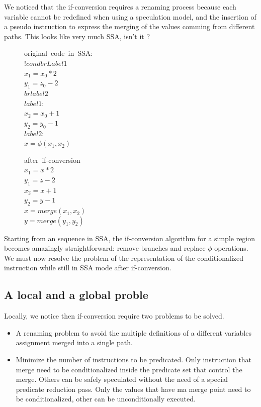 We noticed that the if-conversion requires a renaming process because each variable cannot be redefined when using a speculation model, and the insertion of a pseudo instruction to express the merging of the values comming from different paths. This looks like very much SSA, isn't it ?

\begin{figure}
\begin{minipage}[t]{4cm}
\mbox{original code in SSA:} \\
$ !cond br Label1 $ \\
$ x_1 = x_0 * 2 $ \\
$ y_1 = z_0 - 2 $ \\
$ br label2 $ \\
$ label1: $ \\
$ x_2 = x_0 + 1 $ \\
$ y_2 = y_0 - 1 $ \\
$ label2: $ \\
$ x = \phi (x_1,x_2) $ \\
\end{minipage} 
\begin{minipage}[t]{4cm} 
\mbox{after if-conversion} \\
$ x_1 = x * 2 $ \\
$ y_1 = z - 2 $ \\
$ x_2 = x + 1 $ \\
$ y_2 = y - 1 $ \\
$ x = \textit{merge}(x_1,x_2) $ \\
$ y = \textit{merge}(y_1,y_2) $ \\
\end{minipage}
\end{figure}

Starting from an sequence in SSA, the if-conversion algorithm for a simple region becomes amazingly straightforward: remove branches and replace $\phi$ operations. We must now resolve the problem of the representation of the conditionalized instruction while still in SSA mode after if-conversion. 

\subsection{A local and a global proble}

Locally, we notice then if-conversion require two problems to be solved.
\begin{itemize}
\item A renaming problem to avoid the multiple definitions of a different variables assignment merged into a single path. 
\item Minimize the number of instructions to be predicated. Only instruction that merge need to be conditionalized inside the predicate set that control the merge. Others can be safely speculated without the need of a special predicate reduction pass. Only the values that have ma merge point need to be conditionalized, other can be unconditionally executed.
\end {itemize}

